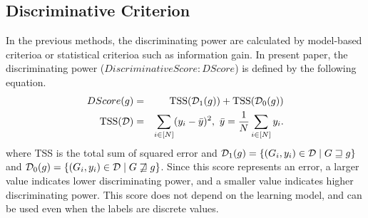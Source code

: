 \subsection{Discriminative Criterion}
\label{sec:criterion}
In the previous methods, the discriminating power are calculated 
by model-based criterioa or statistical criterioa such as information gain.
In present paper, the discriminating power ($Discriminative Score: DScore$) is defined 
by the following equation.
\begin{eqnarray}
  \label{eq:score_R}
  DScore(g) &=& \mathrm{TSS}(\mathcal{D}_1(g)) + \mathrm{TSS}(\mathcal{D}_0(g)) \\
  \mathrm{TSS}(\mathcal{D}) &=& \sum_{i \in [N]}
  (y_i - \bar{y})^2, \,\, \bar{y} = \frac{1}{N} \sum_{i \in [N]} y_i. \nonumber
\end{eqnarray}
where TSS is the total sum of squared error and
$\mathcal{D}_1(g) = \{ (G_i, y_i) \in \mathcal{D} \mid G \sqsupseteq g \} $ and
$\mathcal{D}_0(g) = \{ (G_i, y_i) \in \mathcal{D} \mid G \not\sqsupseteq g \} $.
Since this score represents an error, 
a larger value indicates lower discriminating power, 
and a smaller value indicates higher discriminating power.
This score does not depend on the learning model, 
and can be used even when the labels are discrete values.


